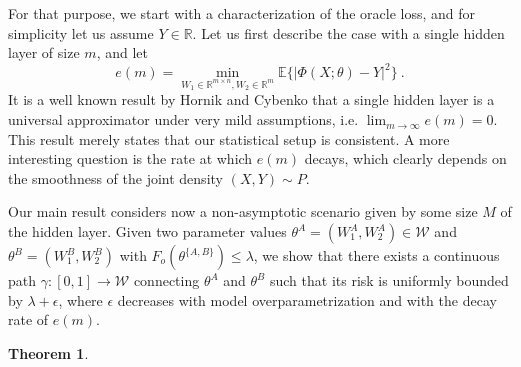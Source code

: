 \documentclass{article} %
\newcommand {\R} {{\mathbb{R}}}
\newcommand {\E} {{\mathbb{E}}}
\newcommand {\Forr} {F_{o}}
\newtheorem{theorem}{Theorem}[section]
\begin{document}
For that purpose, we start with a characterization of the oracle loss, and for simplicity let us assume 
$Y \in \R$. 
Let us first describe the case with a single hidden layer of size $m$, and let
\begin{equation}
\label{bla2}
e(m) = \min_{W_1 \in \R^{m \times n}, W_2 \in \R^m} \E\{ | \Phi(X; \theta) - Y|^2 \}~.
\end{equation}
It is a well known result by Hornik and Cybenko that a single hidden layer 
is a universal approximator under very mild assumptions, i.e. $\lim_{m \to \infty} e(m) = 0$.
This result merely states that our statistical setup is consistent. A more interesting 
question is the rate at which $e(m)$ decays, which clearly depends 
on the smoothness of the joint density $(X, Y) \sim P$. 

Our main result considers now a non-asymptotic scenario given by some 
size $M$ of the hidden layer. Given two parameter values $\theta^A = (W_1^A, W_2^A) \in \mathcal{W}$ 
and $\theta^B= (W_1^B, W_2^B)$ with $\Forr(\theta^{\{A,B\} } ) \leq \lambda$, 
we show that there exists a continuous path 
$\gamma: [0,1] \to \mathcal{W}$ connecting $\theta^A$ and $\theta^B$ 
such that its risk is uniformly bounded by $\lambda + \epsilon$, where $\epsilon$ 
decreases with model overparametrization and with the decay rate of $e(m)$.
\begin{theorem}

\end{theorem}
\end{document}

